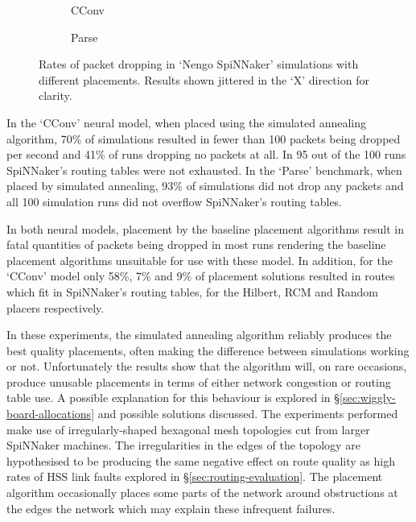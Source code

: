 				\begin{figure}
					\center
					\begin{subfigure}{0.45\linewidth}
						
						\caption{CConv}
						\label{fig:cconv-dropped-packets}
					\end{subfigure}
					\begin{subfigure}{0.45\linewidth}
						
						\caption{Parse}
						\label{fig:parse-dropped-packets}
					\end{subfigure}
					
					\caption[Packet dropping in `Nengo SpiNNaker' simulations]%
					{Rates of packet dropping in `Nengo SpiNNaker' simulations
					with different placements. Results shown jittered in the `X'
					direction for clarity.}
					\label{fig:nengo-dropped-packets}
				\end{figure}
				
				In the `CConv' neural model, when placed using the simulated annealing
				algorithm, 70\% of simulations resulted in fewer than 100 packets being
				dropped per second and 41\% of runs dropping no packets at all.  In 95
				out of the 100 runs SpiNNaker's routing tables were not exhausted. In
				the `Parse' benchmark, when placed by simulated annealing, 93\% of
				simulations did not drop any packets and all 100 simulation runs did
				not overflow SpiNNaker's routing tables.
				
				In both neural models, placement by the baseline placement algorithms
				result in fatal quantities of packets being dropped in most runs
				rendering the baseline placement algorithms unsuitable for use with
				these model. In addition, for the `CConv' model only 58\%, 7\% and 9\%
				of placement solutions resulted in routes which fit in SpiNNaker's
				routing tables, for the Hilbert, RCM and Random placers respectively.
				
				In these experiments, the simulated annealing algorithm reliably
				produces the best quality placements, often making the difference
				between simulations working or not. Unfortunately the results show that
				the algorithm will, on rare occasions, produce unusable placements in
				terms of either network congestion or routing table use. A possible
				explanation for this behaviour is explored in
				\S\ref{sec:wiggly-board-allocations} and possible solutions discussed.
				The experiments performed make use of irregularly-shaped hexagonal mesh
				topologies cut from larger SpiNNaker machines. The irregularities in
				the edges of the topology are hypothesised to be producing the same
				negative effect on route quality as high rates of HSS link faults
				explored in \S\ref{sec:routing-evaluation}. The placement algorithm
				occasionally places some parts of the network around obstructions at
				the edges the network which may explain these infrequent failures.
				
